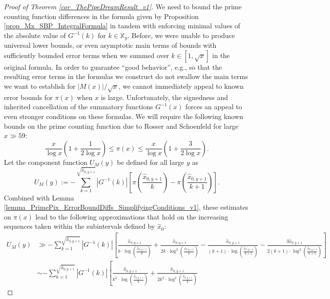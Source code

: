 \documentclass[11pt,reqno,a4letter]{article}
\numberwithin{figure}{section}
\numberwithin{table}{section}
\theoremstyle{plain}
\numberwithin{theorem}{section}
\theoremstyle{definition}
\begin{document}
\begin{proof}[Proof of Theorem \ref{cor_ThePipeDreamResult_v1}]
We need to bound the prime counting function differences in the formula given by 
Proposition \ref{prop_Mx_SBP_IntegralFormula} in tandem with enforcing minimal values of the 
absolute value of $G^{-1}(k)$ for $k \in \mathbb{X}_y$. Before, we were unable to produce 
universal lower bounds, or even asymptotic main terms of bounds with sufficiently bounded 
error terms when we summed over $k \in [1, \sqrt{x}]$ in the original formula. 
In order to guarantee ``good behavior'', e.g., so that the resulting error terms in the 
formulas we construct do not swallow the main terms we want to establish for 
$|M(x)| / \sqrt{x}$, we cannot immediately appeal to known error bounds for $\pi(x)$ when 
$x$ is large. Unfortunately, the signedness and inherited cancellation of the 
summatory functions $G^{-1}(x)$ forces an appeal to even stronger conditions on these 
formulas. 
We will require the following known bounds on the prime counting 
function due to Rosser and Schoenfeld \cite[Thm.\ 1]{ROSSER-SCHOENFELD-1962} 
for large $x \gg 59$: 
\begin{equation} 
\label{eqn_RosserSchoenfeld_PrimePixBounds_v2} 
\frac{x}{\log x}\left(1 + \frac{1}{2\log x}\right) \leq \pi(x) \leq 
     \frac{x}{\log x}\left(1 + \frac{3}{2 \log x}\right). 
\end{equation} 
Let the component function $U_M(y)$ be defined for all large $y$ as 
\[
U_M(y) := -\sum_{k=1}^{\sqrt{\hat{x}_{0,y+1}}} |G^{-1}(k)| \left[ 
     \pi\left(\frac{\hat{x}_{0,y+1}}{k}\right) - 
     \pi\left(\frac{\hat{x}_{0,y+1}}{k+1}\right)
     \right]. 
\]
Combined with Lemma \ref{lemma_PrimePix_ErrorBoundDiffs_SimplifyingConditions_v1}, 
these estimates on $\pi(x)$ lead to the following approximations that hold on the 
increasing sequences taken within the subintervals defined by $\widehat{x}_0$: 
\begin{align*} 
U_M(y) & \gg -\sum_{k=1}^{\sqrt{\hat{x}_{0,y+1}}} |G^{-1}(k)| \left[ 
     \frac{\hat{x}_{0,y+1}}{k \cdot \log\left(\frac{\hat{x}_{0,y+1}}{k}\right)} + 
     \frac{\hat{x}_{0,y+1}}{2k \cdot \log^2\left(\frac{\hat{x}_{0,y+1}}{k}\right)} - 
     \frac{\hat{x}_{0,y+1}}{(k+1) \cdot \log\left(\frac{\hat{x}_{0,y+1}}{k+1}\right)} - 
     \frac{3 \hat{x}_{0,y+1}}{2(k+1) \cdot \log^2\left(\frac{\hat{x}_{0,y+1}}{k+1}\right)}
     \right] \\ 
     & \sim 
     -\sum_{k=1}^{\sqrt{\hat{x}_{0,y+1}}} |G^{-1}(k)| \left[ 
     \frac{\hat{x}_{0,y+1}}{k^2 \cdot \log\left(\frac{\hat{x}_{0,y+1}}{k}\right)} + 
     \frac{\hat{x}_{0,y+1}}{2 k^2 \cdot \log^2\left(\frac{\hat{x}_{0,y+1}}{k}\right)} 

\end{align*}
\end{proof}
\end{document}
